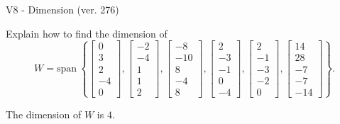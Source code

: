 \begin{exercise}
  \begin{exerciseTitle}V8 - Dimension (ver. 276)\end{exerciseTitle}
  \begin{exerciseStatement}
    Explain how to find the dimension of 
\[W=\mathrm{span}\ \left\{\left[\begin{array}{r}
0 \\
3 \\
2 \\
-4 \\
0
\end{array}\right] , \left[\begin{array}{r}
-2 \\
-4 \\
1 \\
1 \\
2
\end{array}\right] , \left[\begin{array}{r}
-8 \\
-10 \\
8 \\
-4 \\
8
\end{array}\right] , \left[\begin{array}{r}
2 \\
-3 \\
-1 \\
0 \\
-4
\end{array}\right] , \left[\begin{array}{r}
2 \\
-1 \\
-3 \\
-2 \\
0
\end{array}\right] , \left[\begin{array}{r}
14 \\
28 \\
-7 \\
-7 \\
-14
\end{array}\right]\right\}.\]



  \end{exerciseStatement}
  \begin{exerciseAnswer}
   The dimension of \(W\) is  \(4\).
  


  \end{exerciseAnswer}
\end{exercise}